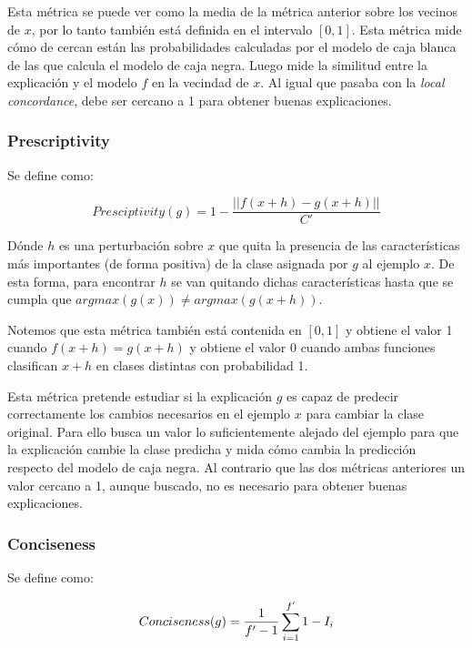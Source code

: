 Esta métrica se puede ver como la media de la métrica anterior sobre los vecinos de $x$, por lo tanto también está definida en el intervalo $[0,1]$. Esta métrica mide cómo de cercan están las probabilidades calculadas por el modelo de caja blanca de las que calcula el modelo de caja negra. Luego mide la similitud entre la explicación y el modelo $f$ en la vecindad de $x$. Al igual que pasaba con la \textit{local concordance}, debe ser cercano a 1 para obtener buenas explicaciones.

\subsubsection*{Prescriptivity}
Se define como:

\begin{equation}
Presciptivity(g) =  1 - \frac{||f(x+h)-g(x+h)||}{C'}
\end{equation}

Dónde $h$ es una perturbación sobre $x$ que quita la presencia de las características más importantes (de forma positiva) de la clase asignada por $g$ al ejemplo $x$. De esta forma, para encontrar $h$ se van quitando dichas características hasta que se cumpla que $argmax(g(x))\neq argmax(g(x+h))$.

Notemos que esta métrica también está contenida en $[0,1]$ y obtiene el valor 1 cuando $f(x+h)=g(x+h)$ y obtiene el valor 0 cuando ambas funciones clasifican $x+h$ en clases distintas con probabilidad 1.

Esta métrica pretende estudiar si la explicación $g$ es capaz de predecir correctamente los cambios necesarios en el ejemplo $x$ para cambiar la clase original. Para ello busca un valor lo suficientemente alejado del ejemplo para que la explicación cambie la clase predicha y mida cómo cambia la predicción respecto del modelo de caja negra. Al contrario que las dos métricas anteriores un valor cercano a 1, aunque buscado, no es necesario para obtener buenas explicaciones.

\subsubsection*{Conciseness}
Se define como:


\begin{equation}
Conciseness(g) =  \frac{1}{f'-1} \sum_{i=1}^{f'} 1-I_i \\
\end{equation} 



